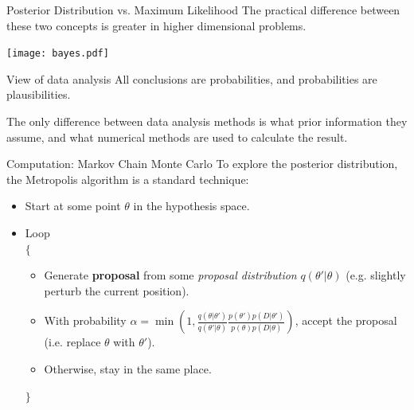 \begin{frame}[t]{Posterior Distribution vs. Maximum Likelihood}
The practical difference between these two concepts is greater in higher
dimensional problems.
\begin{center}
\texttt{[image: bayes.pdf]}
\end{center}
\end{frame}


\begin{frame}[t]{View of data analysis}
All conclusions are probabilities, and probabilities are plausibilities.
\vspace{20pt}

The only difference between data analysis methods is what prior information
they assume, and what numerical methods are used to calculate the result.
\end{frame}

\begin{frame}[t]{Computation: Markov Chain Monte Carlo}
To explore the posterior distribution, the Metropolis algorithm is a standard
technique:

\begin{itemize}
\item Start at some point $\theta$ in the hypothesis space.
\item Loop\\
$\{$
  \begin{itemize}
  \item Generate {\bf proposal} from some {\it proposal distribution} $q(\theta' | \theta)$
  (e.g. slightly perturb the current position).
  \item With probability $\alpha = \min\left(1, \frac{q(\theta | \theta')}{q(\theta' | \theta)}\frac{p(\theta')p(D|\theta')}{p(\theta)p(D|\theta)}\right)$, accept the proposal (i.e. replace $\theta$ with $\theta'$).
  \item Otherwise, stay in the same place.
  \end{itemize}
$\}$
\end{itemize}
\end{frame}


